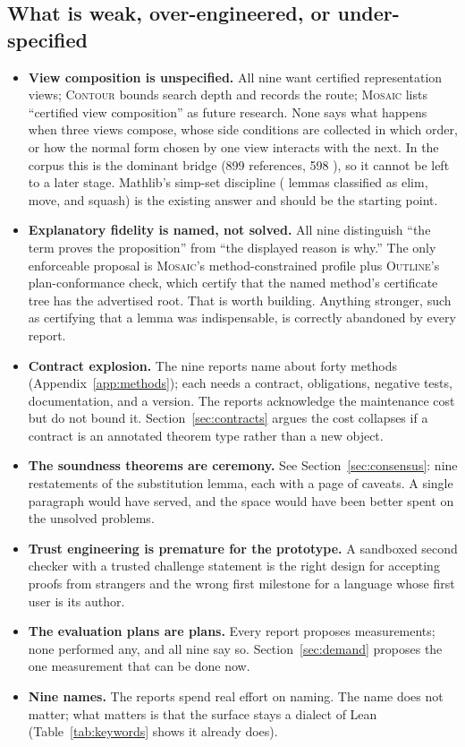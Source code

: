\documentclass[11pt,a4paper]{article}
\newcommand{\code}[1]{\texttt{\detokenize{#1}}}
\newcommand{\Co}{\textsc{Contour}}
\newcommand{\Mo}{\textsc{Mosaic}}
\newcommand{\Ou}{\textsc{Outline}}
\theoremstyle{definition}
\begin{document}
\subsection{What is weak, over-engineered, or under-specified}
\label{sec:weak}
\begin{itemize}
\item \textbf{View composition is unspecified.} All nine want certified representation views; \Co{} bounds search depth and records the route; \Mo{} lists ``certified view composition'' as future research. None says what happens when three views compose, whose side conditions are collected in which order, or how the normal form chosen by one view interacts with the next. In the corpus this is the dominant bridge (899 \code{Nat.cast_*} references, 598 \code{algebraMap}), so it cannot be left to a later stage. Mathlib's \code{norm_cast} simp-set discipline (\code{@[norm_cast]} lemmas classified as elim, move, and squash) is the existing answer and should be the starting point.
\item \textbf{Explanatory fidelity is named, not solved.} All nine distinguish ``the term proves the proposition'' from ``the displayed reason is why.'' The only enforceable proposal is \Mo's method-constrained profile plus \Ou's plan-conformance check, which certify that the named method's certificate tree has the advertised root. That is worth building. Anything stronger, such as certifying that a lemma was indispensable, is correctly abandoned by every report.
\item \textbf{Contract explosion.} The nine reports name about forty methods (Appendix~\ref{app:methods}); each needs a contract, obligations, negative tests, documentation, and a version. The reports acknowledge the maintenance cost but do not bound it. Section~\ref{sec:contracts} argues the cost collapses if a contract is an annotated theorem type rather than a new object.
\item \textbf{The soundness theorems are ceremony.} See Section~\ref{sec:consensus}: nine restatements of the substitution lemma, each with a page of caveats. A single paragraph would have served, and the space would have been better spent on the unsolved problems.
\item \textbf{Trust engineering is premature for the prototype.} A sandboxed second checker with a trusted challenge statement is the right design for accepting proofs from strangers and the wrong first milestone for a language whose first user is its author.
\item \textbf{The evaluation plans are plans.} Every report proposes measurements; none performed any, and all nine say so. Section~\ref{sec:demand} proposes the one measurement that can be done now.
\item \textbf{Nine names.} The reports spend real effort on naming. The name does not matter; what matters is that the surface stays a dialect of Lean (Table~\ref{tab:keywords} shows it already does).
\end{itemize}
\end{document}

